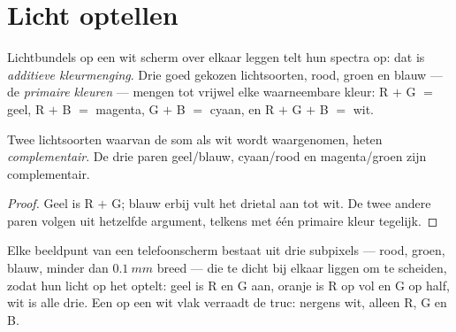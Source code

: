 \section{Licht optellen}

\begin{definition}\label{def:g11:color-light-sources:additive}
Lichtbundels op een wit scherm over elkaar leggen telt hun spectra op:
dat is \emph{additieve kleurmenging}. Drie
goed gekozen lichtsoorten, rood, groen en blauw --- de \emph{primaire
kleuren} --- mengen tot vrijwel elke waarneembare
kleur: R $+$ G $=$ geel, R $+$ B $=$ magenta, G $+$ B $=$ cyaan, en
R $+$ G $+$ B $=$ wit.
\end{definition}

\begin{proposition}\label{prop:g11:color-light-sources:complementary}
Twee lichtsoorten waarvan de som als wit wordt waargenomen, heten
\emph{complementair}. De drie paren
geel/blauw, cyaan/rood en magenta/groen zijn complementair.
\end{proposition}

\begin{proof}
Geel is R $+$ G; blauw erbij vult het drietal aan tot wit. De twee andere
paren volgen uit hetzelfde argument, telkens met één primaire kleur
tegelijk.
\end{proof}

\begin{example}[Schermen]\label{ex:g11:color-light-sources:screen}
Elke beeldpunt van een telefoonscherm bestaat uit drie subpixels ---
rood, groen, blauw, minder dan $\qty{0.1}{mm}$ breed --- die te dicht bij
elkaar liggen om te scheiden, zodat hun licht op het  optelt:
geel is R en G aan, oranje is R op vol  en G op half, wit is alle
drie. Een  op een wit vlak verraadt de truc: nergens wit, alleen R, G
en B.
\end{example}

